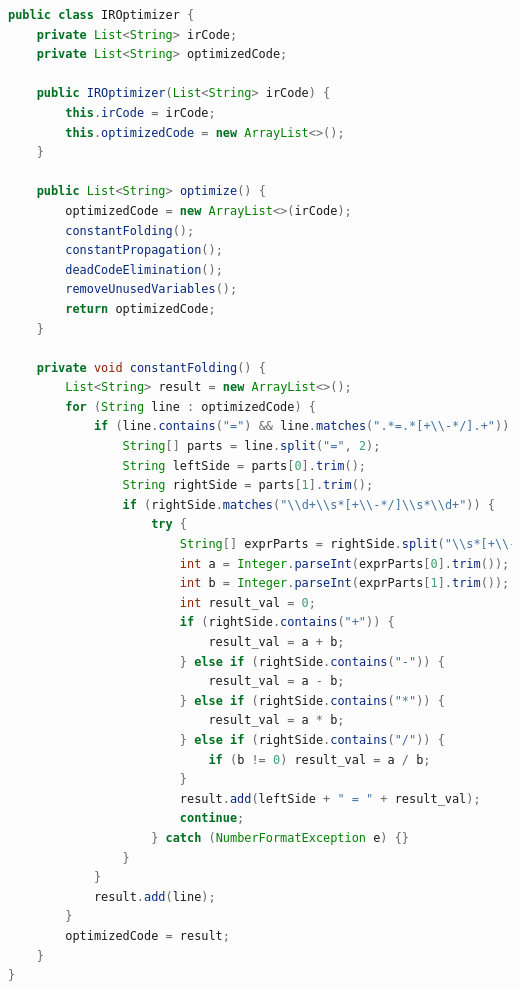 \documentclass[12pt]{article}
\begin{document}
\begin{lstlisting}[language=Java,caption={Excerpt from IROptimizer.java}]
public class IROptimizer {
    private List<String> irCode;
    private List<String> optimizedCode;

    public IROptimizer(List<String> irCode) {
        this.irCode = irCode;
        this.optimizedCode = new ArrayList<>();
    }

    public List<String> optimize() {
        optimizedCode = new ArrayList<>(irCode);
        constantFolding();
        constantPropagation();
        deadCodeElimination();
        removeUnusedVariables();
        return optimizedCode;
    }

    private void constantFolding() {
        List<String> result = new ArrayList<>();
        for (String line : optimizedCode) {
            if (line.contains("=") && line.matches(".*=.*[+\\-*/].+")) {
                String[] parts = line.split("=", 2);
                String leftSide = parts[0].trim();
                String rightSide = parts[1].trim();
                if (rightSide.matches("\\d+\\s*[+\\-*/]\\s*\\d+")) {
                    try {
                        String[] exprParts = rightSide.split("\\s*[+\\-*/]\\s*");
                        int a = Integer.parseInt(exprParts[0].trim());
                        int b = Integer.parseInt(exprParts[1].trim());
                        int result_val = 0;
                        if (rightSide.contains("+")) {
                            result_val = a + b;
                        } else if (rightSide.contains("-")) {
                            result_val = a - b;
                        } else if (rightSide.contains("*")) {
                            result_val = a * b;
                        } else if (rightSide.contains("/")) {
                            if (b != 0) result_val = a / b;
                        }
                        result.add(leftSide + " = " + result_val);
                        continue;
                    } catch (NumberFormatException e) {}
                }
            }
            result.add(line);
        }
        optimizedCode = result;
    }
}
\end{lstlisting}
\end{document}
